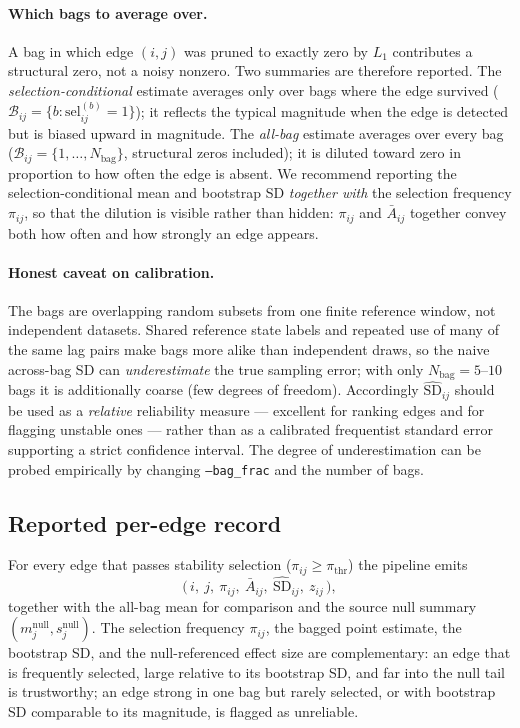 \documentclass[11pt]{article}
\begin{document}
\paragraph{Which bags to average over.} A bag in which edge \((i,j)\) was
pruned to exactly zero by \(L_1\) contributes a structural zero, not a noisy
nonzero. Two summaries are therefore reported. The
\emph{selection-conditional} estimate averages only over bags where the edge
survived (\(\mathcal{B}_{ij}=\{b:\text{sel}^{(b)}_{ij}=1\}\)); it reflects the
typical magnitude when the edge is detected but is biased upward in
magnitude. The \emph{all-bag} estimate averages over every bag
(\(\mathcal{B}_{ij}=\{1,\dots,N_{\text{bag}}\}\), structural zeros included);
it is diluted toward zero in proportion to how often the edge is absent. We
recommend reporting the selection-conditional mean and bootstrap SD
\emph{together with} the selection frequency \(\pi_{ij}\), so that the dilution is visible
rather than hidden: \(\pi_{ij}\) and \(\bar A_{ij}\) together convey both how
often and how strongly an edge appears.

\paragraph{Honest caveat on calibration.} The bags are overlapping random
subsets from one finite reference window, not independent datasets. Shared
reference state labels and repeated use of many of the same lag pairs make
bags more alike than independent draws, so the naive across-bag SD can
\emph{underestimate} the true sampling error; with only
\(N_{\text{bag}}=5\)--\(10\) bags it is additionally coarse (few degrees of
freedom). Accordingly \(\widehat{\mathrm{SD}}_{ij}\) should be used as a
\emph{relative} reliability measure --- excellent for ranking edges and for
flagging unstable ones --- rather than as a calibrated frequentist standard
error supporting a strict confidence interval. The degree of underestimation
can be probed empirically by changing \texttt{--bag\_frac} and the number of
bags.

\subsection{Reported per-edge record}

For every edge that passes stability selection
(\(\pi_{ij}\ge\pi_{\text{thr}}\)) the pipeline emits
\[
\big(\,i,\ j,\ \pi_{ij},\ \bar A_{ij},\ \widehat{\mathrm{SD}}_{ij},\ z_{ij}\,\big),
\]
together with the all-bag mean for comparison and the source null summary
\((m^{\text{null}}_j,s^{\text{null}}_j)\). The selection frequency
\(\pi_{ij}\), the bagged point estimate, the bootstrap SD, and the
null-referenced effect size are complementary: an edge that is frequently
selected, large relative to its bootstrap SD, and far into the null tail is
trustworthy; an edge strong in one bag but rarely selected, or with bootstrap SD
comparable to its magnitude, is flagged as unreliable.
\end{document}
